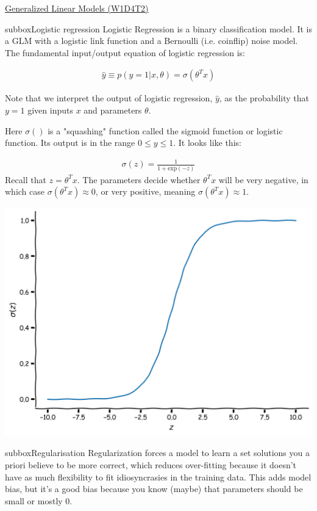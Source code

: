 \begin{textbox}{\href{https://compneuro.neuromatch.io/tutorials/W1D4_GeneralizedLinearModels/student/W1D4_Tutorial2.html}{Generalized Linear Models (W1D4T2)} }
\begin{subbox}{subbox}{Logistic regression}
\scriptsize
Logistic Regression is a binary classification model. It is a GLM with a logistic link function and a Bernoulli (i.e. coinflip) noise model.
The fundamental input/output equation of logistic regression is:

\begin{align}
\hat{y} \equiv p(y=1|x,\theta) = \sigma(\theta^Tx)
\end{align}

Note that we interpret the output of logistic regression, $\hat{y}$, as the probability that $y = 1$ given inputs $x$ and parameters $\theta$.

Here $\sigma()$ is a "squashing" function called the sigmoid function or logistic function. Its output is in the range $0 \leq y \leq 1$. It looks like this:

\begin{align}
\sigma(z) = \frac{1}{1 + \textrm{exp}(-z)}
\end{align}
Recall that $z = \theta^T x$. The parameters decide whether $\theta^T x$ will be very negative, in which case $\sigma(\theta^T x)\approx 0$, or very positive, meaning  $\sigma(\theta^T x)\approx 1$.

\centering
\includegraphics[scale=0.07]{Figures/GLM/GLMFigure5.png}
\end{subbox}

\begin{subbox}{subbox}{Regularisation 
}
\scriptsize
Regularization forces a model to learn a set solutions you a priori believe to be more correct, which reduces over-fitting because it doesn't have as much flexibility to fit idiosyncrasies in the training data. This adds model bias, but it's a good bias because you know (maybe) that parameters should be small or mostly 0.


\end{subbox}
\end{textbox}
